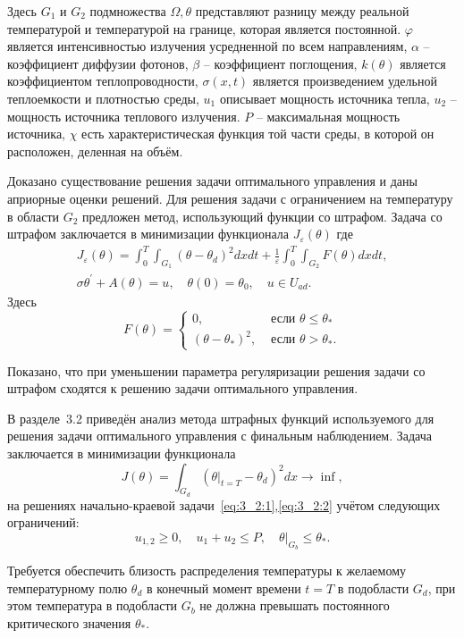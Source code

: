 Здесь $G_{1}$ и $G_{2}$ подмножества $\Omega, \theta$
представляют разницу между реальной температурой
и температурой на границе, которая является постоянной.
$\varphi$ является интенсивностью излучения усредненной по всем направлениям,
$\alpha$ -- коэффициент диффузии фотонов, $\beta$ -- коэффициент поглощения,
$k(\theta)$ является коэффициентом теплопроводности, $\sigma(x, t)$
является произведением удельной теплоемкости и плотностью среды, $u_{1}$
описывает мощность источника тепла, $u_{2}$ -- мощность источника теплового излучения.
$P$ -- максимальная мощность источника,
$\chi$ есть характеристическая функция той части среды,
в которой он расположен, деленная на объём.


Доказано существование решения задачи оптимального
управления и даны априорные оценки решений.
Для решения задачи с ограничением на температуру в области $G_2$
предложен метод, использующий функции со штрафом.
Задача со штрафом заключается в минимизации функционала $J_{\varepsilon}(\theta)$
где
\begin{gather*}
    J_{\varepsilon}(\theta)=\int_{0}^{T}
    \int_{G_{1}}\left(\theta-\theta_{d}\right)^{2} dx dt
    +\frac{1}{\varepsilon} \int_{0}^{T}
    \int_{G_{2}} F(\theta) d x d t, \\
    \sigma \theta^{\prime}+A(\theta)=u,
    \quad \theta(0)=\theta_{0}, \quad u \in U_{a d}.
\end{gather*}
Здесь
\[
    F(\theta)=
    \begin{cases}
        0, & \text { если } \theta \leq \theta_{*} \\
        \left(\theta-\theta_{*}\right)^{2},
        & \text { если } \theta>\theta_{*}.
    \end{cases}
\]


Показано, что при уменьшении параметра регуляризации
решения задачи со штрафом сходятся к решению задачи оптимального управления.

В разделе~3.2 приведён анализ метода штрафных функций используемого
для решения задачи оптимального управления с финальным наблюдением.
Задача заключается в минимизации функционала
\[
    J(\theta)=\int_{G_{d}}\left(\left.\theta\right|_{t=T}
    -\theta_{d}\right)^{2} d x \rightarrow \inf,
\]
на решениях начально-краевой задачи~\eqref{eq:3_2:1},\eqref{eq:3_2:2}
учётом следующих ограничений:
\[
    u_{1,2} \geq 0, \quad u_{1}+u_{2} \leq P,\left.\quad \theta\right|_{G_{b}} \leq \theta_{*}.
\]

Требуется обеспечить близость распределения температуры к желаемому температурному полю $\theta_{d}$
в конечный момент времени $t=T$ в подобласти $G_{d}$, при этом температура в подобласти $G_{b}$
не должна превышать постоянного критического значения $\theta_{*}$.


